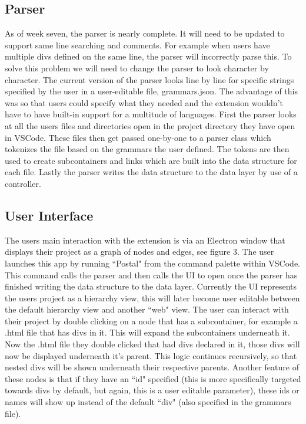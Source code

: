 \documentclass[letterpaper,10pt,titlepage,draftclsnofoot,onecolumn,onesided] {IEEEtran}
\begin{document}
	\subsection{Parser}
	As of week seven, the parser is nearly complete.
	It will need to be updated to support same line searching and comments.
	For example when users have multiple divs defined on the same line, the parser will incorrectly parse this.
	To solve this problem we will need to change the parser to look character by character.
	The current version of the parser looks line by line for specific strings specified by the user in a user-editable file, grammars.json.
	The advantage of this was so that users could specify what they needed and the extension wouldn't have to have built-in support for a multitude of languages.
	First the parser looks at all the users files and directories open in the project directory they have open in VSCode.
	These files then get passed one-by-one to a parser class which tokenizes the file based on the grammars the user defined.
	The tokens are then used to create subcontainers and links which are built into the data structure for each file.
	Lastly the parser writes the data structure to the data layer by use of a controller.

	\subsection{User Interface}
	The users main interaction with the extension is via an Electron window that displays their project as a graph of nodes and edges, see figure 3.
	The user launches this app by running ``Postal" from the command palette within VSCode.
	This command calls the parser and then calls the UI to open once the parser has finished writing the data structure to the data layer.
	Currently the UI represents the users project as a hierarchy view, this will later become user editable between the default hierarchy view and another ``web" view.
	The user can interact with their project by double clicking on a node that has a subcontainer, for example a .html file that has divs in it.
	This will expand the subcontainers underneath it.
	Now the .html file they double clicked that had divs declared in it, those divs will now be displayed underneath it's parent.
	This logic continues recursively, so that nested divs will be shown underneath their respective parents. 
	Another feature of these nodes is that if they have an ``id" specified (this is more specifically targeted towards divs by default, but again, this is a user editable parameter), these ids or names will show up instead of the default ``div" (also specified in the grammars file).
\end{document}
